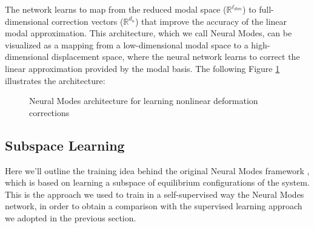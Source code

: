 The network learns to map from the reduced modal space (\( \mathbb{R}^{\ell_{dim}} \)) to full-dimensional correction vectors (\( \mathbb{R}^{d_u} \)) that improve the accuracy of the linear modal approximation. This architecture, which we call Neural Modes, can be visualized as a mapping from a low-dimensional modal space to a high-dimensional displacement space, where the neural network learns to correct the linear approximation provided by the modal basis. The following Figure \ref{fig:neural_modes_arch} illustrates the architecture:
\begin{figure}[H]    \centering
    \caption{Neural Modes architecture for learning nonlinear deformation corrections}
    \label{fig:neural_modes_arch}
\end{figure}


\subsection{Subspace Learning}
Here we'll outline the training idea behind the original Neural Modes framework \cite{Wang_Du_Coros_Thomaszewski_2024}, which is based on learning a subspace of equilibrium configurations of the system. This is the approach we used to train in a self-supervised way the Neural Modes network, in order to obtain a comparison with the supervised learning approach we adopted in the previous section.


